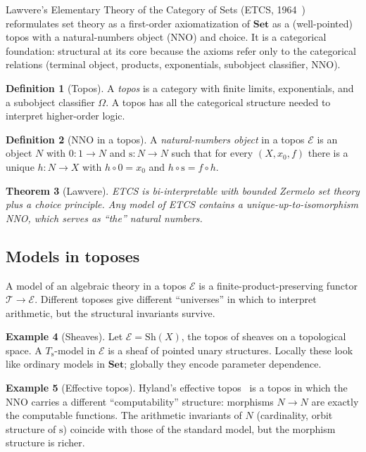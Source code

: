 \documentclass[12pt]{article}
\newtheorem{theorem}{Theorem}[section]
\theoremstyle{definition}
\newtheorem{definition}[theorem]{Definition}
\newtheorem{example}[theorem]{Example}
\theoremstyle{remark}
\newcommand{\Set}{\mathbf{Set}}
\newcommand{\T}{\mathcal{T}}
\newcommand{\E}{\mathcal{E}}
\newcommand{\succop}{\mathrm{s}}
\begin{document}
Lawvere's Elementary Theory of the Category of Sets (ETCS, 1964~\cite{Lawvere1964}) reformulates set theory as a first-order axiomatization of $\Set$ as a (well-pointed) topos with a natural-numbers object (NNO) and choice. It is a categorical foundation: structural at its core because the axioms refer only to the categorical relations (terminal object, products, exponentials, subobject classifier, NNO).

\begin{definition}[Topos]
A \emph{topos} is a category with finite limits, exponentials, and a subobject classifier $\Omega$. A topos has all the categorical structure needed to interpret higher-order logic.
\end{definition}

\begin{definition}[NNO in a topos]
A \emph{natural-numbers object} in a topos $\E$ is an object $N$ with $0 : 1 \to N$ and $\succop : N \to N$ such that for every $(X, x_0, f)$ there is a unique $h : N \to X$ with $h \circ 0 = x_0$ and $h \circ \succop = f \circ h$.
\end{definition}

\begin{theorem}[Lawvere]
ETCS is bi-interpretable with bounded Zermelo set theory plus a choice principle. Any model of ETCS contains a unique-up-to-isomorphism NNO, which serves as ``the'' natural numbers.
\end{theorem}

\subsection{Models in toposes}

A model of an algebraic theory in a topos $\E$ is a finite-product-preserving functor $\T \to \E$. Different toposes give different ``universes'' in which to interpret arithmetic, but the structural invariants survive.

\begin{example}[Sheaves]
Let $\E = \mathrm{Sh}(X)$, the topos of sheaves on a topological space. A $T_\succop$-model in $\E$ is a sheaf of pointed unary structures. Locally these look like ordinary models in $\Set$; globally they encode parameter dependence.
\end{example}

\begin{example}[Effective topos]
Hyland's effective topos~\cite{Hyland1982} is a topos in which the NNO carries a different ``computability'' structure: morphisms $N \to N$ are exactly the computable functions. The arithmetic invariants of $N$ (cardinality, orbit structure of $\succop$) coincide with those of the standard model, but the morphism structure is richer.
\end{example}
\end{document}

